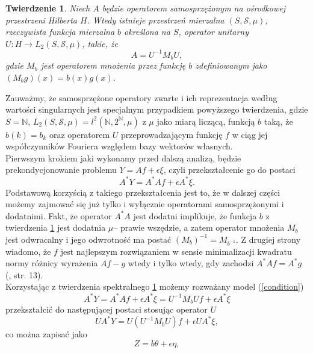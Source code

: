 \documentclass{mwart}
\newtheorem{tw}{Twierdzenie}
\begin{document}
\begin{tw}\label{spectral}
Niech $A$ będzie operatorem samosprzężonym na ośrodkowej przestrzeni Hilberta $H$. Wtedy istnieje przestrzeń mierzalna $(S,\mathcal{S},\mu )$, rzeczywista funkcja mierzalna $b$ określona na $S$, operator unitarny $U\colon H\to L_2(S,\mathcal{S},\mu )$, takie, że 
\begin{displaymath}
A=U^{-1}M_bU,
\end{displaymath}
gdzie $M_b$ jest operatorem mnożenia przez funkcję $b$ zdefiniowanym jako $(M_bg)(x)=b(x)g(x)$.
\end{tw}
Zauważmy, że samosprzężone operatory zwarte i ich reprezentacja według wartości singularnych jest specjalnym przypadkiem powyższego twierdzenia, gdzie $S=\mathbb{N}$, $L_2(S,\mathcal{S},\mu) =l^2(\mathbb{N},2^{\mathbb{N}},\mu )$ z $\mu$ jako miarą liczącą, funkcją $b$ taką, że $b(k)=b_k$ oraz operatorem $U$ przeprowadzającym funkcję $f$ w ciąg jej współczynników Fouriera względem bazy wektorów własnych.\\
\indent Pierwszym krokiem jaki wykonamy przed dalszą analizą, będzie prekondycjonowanie problemu $Y=Af+\epsilon \xi$, czyli przekształcenie go do postaci 
\begin{equation}\label{condition}
A^*Y=A^*Af+\epsilon A^*\xi.
\end{equation} 
Podstawową korzyścią z takiego przekształcenia jest to, że w dalszej części możemy zajmować się już tylko i wyłącznie operatorami samosprzężonymi i dodatnimi. Fakt, że operator $A^*A$ jest dodatni implikuje, że funkcja $b$ z twierdzenia \ref{spectral} jest dodatnia $\mu$-- prawie wszędzie, a zatem operator mnożenia $M_b$ jest odwracalny i jego odwrotność ma postać $(M_b)^{-1}=M_{b^{-1}}$. Z drugiej strony wiadomo, że $f$ jest najlepszym rozwiązaniem w sensie minimalizacji kwadratu normy różnicy wyrażenia $Af-g$ wtedy i tylko wtedy, gdy zachodzi $A^*Af=A^*g$ (\cite{iphde}, str. 13).\\
\indent Korzystając z twierdzenia spektralnego \ref{spectral} możemy rozważany model (\ref{condition})
\begin{displaymath}
A^*Y=A^*Af+\epsilon A^*\xi=U^{-1}M_bUf+\epsilon A^* \xi
\end{displaymath} przekształcić do następującej postaci stosując operator $U$
\begin{displaymath}
UA^*Y=U(U^{-1}M_bU)f+\epsilon UA^*\xi,
\end{displaymath}
co można zapisać jako
\begin{equation}\label{zb}
Z=b\theta+\epsilon \eta,
\end{equation}
\end{document}
